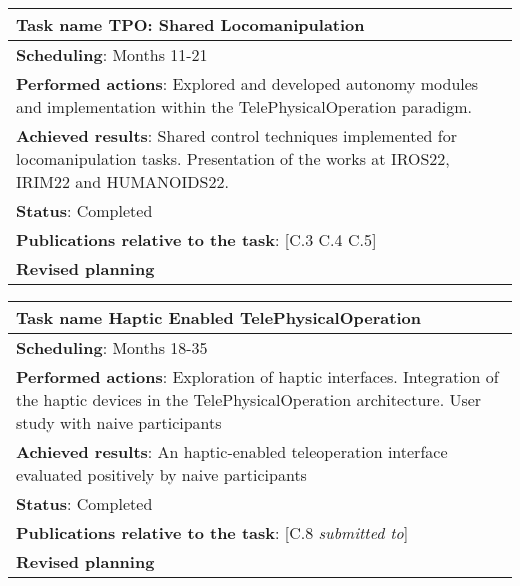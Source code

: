 \begin{table}[H]
	\begin{center}
		\renewcommand{\arraystretch}{1.3} %
		\setlength{\tabcolsep}{8pt} %
		\begin{tabular}{|P{15cm}|}
			\hline
			\textbf{Task name} TPO: Shared Locomanipulation \\ \hline
			\textbf{Scheduling}: Months 11-21 \\ \hline
			\textbf{Performed actions}: Explored and developed autonomy modules and implementation within the TelePhysicalOperation paradigm.\\
			\hline
			\textbf{Achieved results}: Shared control techniques implemented for locomanipulation tasks. Presentation of the works at IROS22, IRIM22 and HUMANOIDS22. \\
			\hline
			\textbf{Status}: Completed\\
			\hline
			\textbf{Publications relative to the task}: [C.3 C.4 C.5]\\
			\hline
			\textbf{Revised planning}\\
			\hline
		\end{tabular}
	\end{center}
\end{table}

\begin{table}[H]
	\begin{center}
		\renewcommand{\arraystretch}{1.3} %
		\setlength{\tabcolsep}{8pt} %
		\begin{tabular}{|P{15cm}|}
			\hline
			\textbf{Task name} Haptic Enabled TelePhysicalOperation \\ \hline
			\textbf{Scheduling}: Months 18-35 \\ \hline
			\textbf{Performed actions}: Exploration of haptic interfaces. Integration of the haptic devices in the TelePhysicalOperation architecture. User study with naive participants\\
			\hline
			\textbf{Achieved results}: An haptic-enabled teleoperation interface evaluated positively by naive participants \\
			\hline
			\textbf{Status}: Completed\\
			\hline
			\textbf{Publications relative to the task}: [C.8 \textit{submitted to}]\\
			\hline
			\textbf{Revised planning}\\
			\hline
		\end{tabular}
	\end{center}
\end{table}

